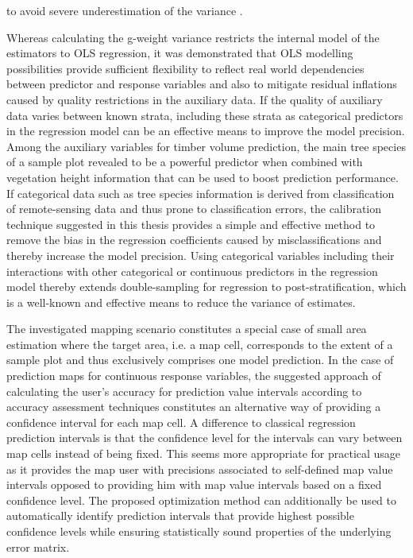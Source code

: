 to avoid severe underestimation of the variance \citep{massey2015a, massey2015_thesis}.\par


Whereas calculating the g-weight variance restricts the internal model of the estimators to OLS regression, it was demonstrated that OLS modelling possibilities provide sufficient flexibility to reflect real world dependencies between predictor and response variables and also to mitigate residual inflations caused by quality restrictions in the auxiliary data. If the quality of auxiliary data varies between known strata, including these strata as categorical predictors in the regression model can be an effective means to improve the model precision. Among the auxiliary variables for timber volume prediction, the main tree species of a sample plot revealed to be a powerful predictor when combined with vegetation height information that can be used to boost prediction performance. If categorical data such as tree species information is derived from classification of remote-sensing data and thus prone to classification errors, the calibration technique suggested in this thesis provides a simple and effective method to remove the bias in the regression coefficients caused by misclassifications and thereby increase the model precision. Using categorical variables including their interactions with other categorical or continuous predictors in the regression model thereby extends double-sampling for regression to post-stratification, which is a well-known and effective means to reduce the variance of estimates.\par


The investigated mapping scenario constitutes a special case of small area estimation where the target area, i.e. a map cell, corresponds to the extent of a sample plot and thus exclusively comprises one model prediction. In the case of prediction maps for continuous response variables, the suggested approach of calculating the user's accuracy for prediction value intervals according to accuracy assessment techniques constitutes an alternative way of providing a confidence interval for each map cell. A difference to classical regression prediction intervals is that the confidence level for the intervals can vary between map cells instead of being fixed. This seems more appropriate for practical usage as it provides the map user with precisions associated to self-defined map value intervals opposed to providing him with map value intervals based on a fixed confidence level. The proposed optimization method can additionally be used to automatically identify prediction intervals that provide highest possible confidence levels while ensuring statistically sound properties of the underlying error matrix.  

